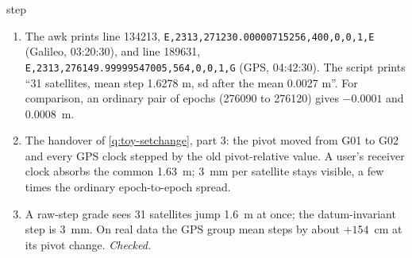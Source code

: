 \begin{answer}{step}
\solution
\begin{enumerate}[leftmargin=*, itemsep=1pt]
\item The awk prints line 134213, \texttt{E,2313,271230.00000715256,400,0,0,1,E}
      (Galileo, 03:20:30), and line 189631, \texttt{E,2313,276149.99999547005,564,0,0,1,G}
      (GPS, 04:42:30). The script prints ``31 satellites, mean step 1.6278 m, sd
      after the mean 0.0027 m''. For comparison, an ordinary pair of epochs (276090 to
      276120) gives $-0.0001$ and 0.0008~m.
\item The handover of \cref{q:toy-setchange}, part 3: the pivot moved from G01 to G02
      and every GPS clock stepped by the old pivot-relative value. A user's receiver
      clock absorbs the common 1.63~m; 3~mm per satellite stays visible, a few times
      the ordinary epoch-to-epoch spread.
\item A raw-step grade sees 31 satellites jump 1.6~m at once; the datum-invariant
      step is 3~mm. On real data the GPS group mean steps by about $+154$~cm at its
      pivot change. \emph{Checked.}
\end{enumerate}
\end{answer}

